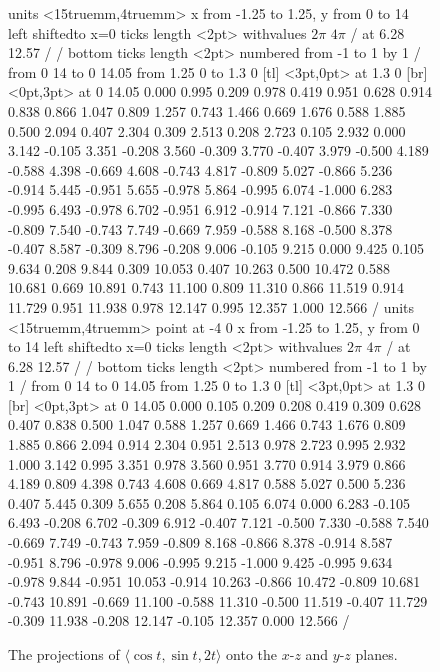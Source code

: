 \begin{figure}[H]
\centerline{
\vbox{\beginpicture
\normalgraphs
\setcoordinatesystem units <15truemm,4truemm>
\setplotarea x from -1.25 to 1.25, y from 0 to 14
\axis left shiftedto x=0 ticks length <2pt> withvalues {$2\pi$} {$4\pi$} /
  at 6.28 12.57 / /
\axis bottom ticks length <2pt> numbered from -1 to 1 by 1 /
\arrow <4pt> [0.35, 1] from 0 14 to 0 14.05
\arrow <4pt> [0.35, 1] from 1.25 0 to 1.3 0
 [tl] <3pt,0pt> at 1.3 0 
 [br] <0pt,3pt> at 0 14.05 
 0.000 0.995 0.209 0.978 0.419 0.951 0.628 0.914 0.838 0.866
1.047 0.809 1.257 0.743 1.466 0.669 1.676 0.588 1.885 0.500 2.094
0.407 2.304 0.309 2.513 0.208 2.723 0.105 2.932 0.000 3.142 -0.105
3.351 -0.208 3.560 -0.309 3.770 -0.407 3.979 -0.500 4.189 -0.588 4.398
-0.669 4.608 -0.743 4.817 -0.809 5.027 -0.866 5.236 -0.914 5.445
-0.951 5.655 -0.978 5.864 -0.995 6.074 -1.000 6.283 -0.995 6.493
-0.978 6.702 -0.951 6.912 -0.914 7.121 -0.866 7.330 -0.809 7.540
-0.743 7.749 -0.669 7.959 -0.588 8.168 -0.500 8.378 -0.407 8.587
-0.309 8.796 -0.208 9.006 -0.105 9.215 0.000 9.425 0.105 9.634 0.208
9.844 0.309 10.053 0.407 10.263 0.500 10.472 0.588 10.681 0.669 10.891
0.743 11.100 0.809 11.310 0.866 11.519 0.914 11.729 0.951 11.938 0.978
12.147 0.995 12.357 1.000 12.566 /
\setcoordinatesystem units <15truemm,4truemm> point at -4 0
\setplotarea x from -1.25 to 1.25, y from 0 to 14
\axis left shiftedto x=0 ticks length <2pt>  withvalues {$2\pi$} {$4\pi$} /
  at 6.28 12.57 / /
\axis bottom ticks length <2pt> numbered from -1 to 1 by 1 /
\arrow <4pt> [0.35, 1] from 0 14 to 0 14.05
\arrow <4pt> [0.35, 1] from 1.25 0 to 1.3 0
 [tl] <3pt,0pt> at 1.3 0 
 [br] <0pt,3pt> at 0 14.05 
 0.000 0.105 0.209 0.208 0.419 0.309 0.628 0.407 0.838 0.500
 1.047 0.588 1.257 0.669 1.466 0.743 1.676 0.809 1.885 0.866 2.094
 0.914 2.304 0.951 2.513 0.978 2.723 0.995 2.932 1.000 3.142 0.995
 3.351 0.978 3.560 0.951 3.770 0.914 3.979 0.866 4.189 0.809 4.398
 0.743 4.608 0.669 4.817 0.588 5.027 0.500 5.236 0.407 5.445 0.309
 5.655 0.208 5.864 0.105 6.074 0.000 6.283 -0.105 6.493 -0.208 6.702
 -0.309 6.912 -0.407 7.121 -0.500 7.330 -0.588 7.540 -0.669 7.749
 -0.743 7.959 -0.809 8.168 -0.866 8.378 -0.914 8.587 -0.951 8.796
 -0.978 9.006 -0.995 9.215 -1.000 9.425 -0.995 9.634 -0.978 9.844
 -0.951 10.053 -0.914 10.263 -0.866 10.472 -0.809 10.681 -0.743 10.891
 -0.669 11.100 -0.588 11.310 -0.500 11.519 -0.407 11.729 -0.309 11.938
 -0.208 12.147 -0.105 12.357 0.000 12.566 /
\endpicture}}
\caption{The projections of $\langle \cos t,\sin
t,2t\rangle$ onto the $x$-$z$ and $y$-$z$ planes. \label{fig:helix projections}}
\end{figure}


